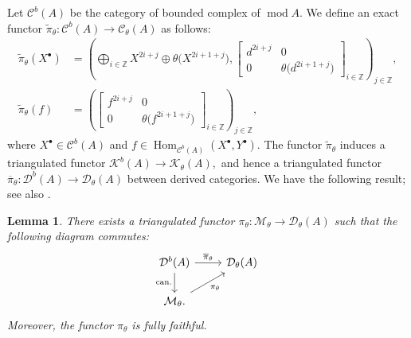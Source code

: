 \documentclass[12pt,reqno]{amsart}
\numberwithin{equation}{section}
\newcommand{\Hom}{\operatorname{Hom}\nolimits}
\newtheorem{lemma}[theorem]{Lemma}
\begin{document}
	Let $\mathcal{C}^b(A)$ be the category of bounded complex of $\operatorname{mod} A$.
	We define an exact functor
	$\widetilde{\pi}_{\theta}:\mathcal{C}^b(A)\rightarrow \mathcal{C}_{\theta}(A)$
	as follows:
	\begin{align*}
		\widetilde{\pi}_{\theta}(X^{\bullet})
		&=
		\left(
		\bigoplus_{i\in\mathbb{Z}} X^{2i+j}
		\oplus
		\theta\bigl(X^{2i+1+j}\bigr),
		\begin{bmatrix}
			d^{2i+j} & 0 \\
			0 & \theta\bigl(d^{2i+1+j}\bigr)
		\end{bmatrix}_{i\in\mathbb{Z}}
		\right)_{j\in\mathbb{Z}}, \\
		\widetilde{\pi}_{\theta}(f)
		&=
		\left(
		\begin{bmatrix}
			f^{2i+j} & 0 \\
			0 & \theta\bigl(f^{2i+1+j}\bigr)
		\end{bmatrix}_{i\in\mathbb{Z}}
		\right)_{j\in\mathbb{Z}},
	\end{align*}
	where $X^\bullet\in \mathcal{C}^b(A)$ and
	$f\in \Hom_{\mathcal{C}^b(A)}(X^\bullet,Y^\bullet)$. The functor
	$\widetilde{\pi}_{\theta}$ induces a triangulated functor
	$\mathcal{K}^b(A)\rightarrow \mathcal{K}_{\theta}(A),$
	and hence a triangulated functor $\overline{\pi}_{\theta}:\mathcal{D}^b(A)\rightarrow \mathcal{D}_{\theta}(A)$ between derived categories. We have the following result; see also \cite[Theorem 2.12]{LR24}.
	
	\begin{lemma}\label{lem:pi-theta-fully-fathful}
		There exists a triangulated functor
		$\pi_{\theta}:\mathcal{M}_{\theta}\rightarrow \mathcal{D}_{\theta}(A)$
		such that the following diagram commutes:
		\[
		\begin{tikzcd}
			\mathcal{D}^{b}(A)
			\arrow[r, "\overline{\pi}_{\theta}"]
			\arrow[d, "\mathrm{can.}"']
			&
			\mathcal{D}_{\theta}(A)
			\\
			\mathcal{M}_{\theta}.
			\arrow[ur, "\pi_{\theta}"']
			&
		\end{tikzcd}
		\]
		Moreover, the functor $\pi_{\theta}$ is fully faithful.
	\end{lemma}
	
\end{document}
